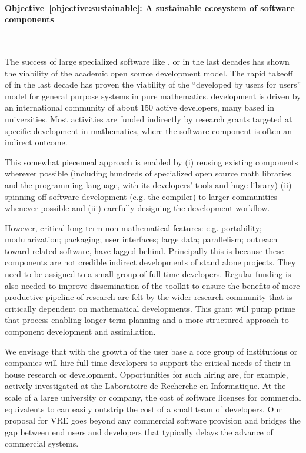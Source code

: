 \documentclass[noworkareas,deliverables,\classoptions]{euproposal}       %
\begin{document}
\begin{proposal}
\paragraph{Objective~\ref{objective:sustainable}: A sustainable
  ecosystem of software components}\ 

The success of large specialized software like \PariGP, \Singular or
\GAP in the last decades has shown the viability of the academic open
source development model. The rapid takeoff of \Sage in the last
decade has proven the viability of the ``developed by users for
users'' model for general purpose systems in pure mathematics.  \Sage
development is driven by an international community of about 150
active developers, many based in universities.  Most activities are
funded indirectly by research grants targeted at specific development
in mathematics, where the software component is often an indirect
outcome.

This somewhat piecemeal approach is enabled by (i) reusing existing
components wherever possible (including hundreds of specialized open
source math libraries and the \Python programming language, with its
developers' tools and huge library) (ii) spinning off software
development (e.g. the \Cython compiler) to larger communities whenever
possible and (iii) carefully designing the development workflow.

However, critical long-term non-mathematical features:
e.g. portability; modularization; packaging; user interfaces; large
data; parallelism; outreach toward related software, have lagged
behind. Principally this is because these components are not credible
indirect developments of stand alone projects. They need to be
assigned to a small group of full time developers. Regular funding is
also needed to improve dissemination of the toolkit to ensure the
benefits of more productive pipeline of research are felt by the wider
research community that is critically dependent on mathematical
developments. This grant will pump prime that process enabling longer
term planning and a more structured approach to component development
and assimilation.

We envisage that with the growth of the user base a core group of
institutions or companies will hire full-time developers to support
the critical needs of their in-house research or development.
Opportunities for such hiring are, for example, actively investigated
at the Laboratoire de Recherche en Informatique. At the scale of a
large university or company, the cost of software licenses for
commercial equivalents to \Sage can easily outstrip the cost of a
small team of developers. Our proposal for VRE goes beyond any
commercial software provision and bridges the gap between end users
and developers that typically delays the advance of commercial
systems.


\end{proposal}
\end{document}
